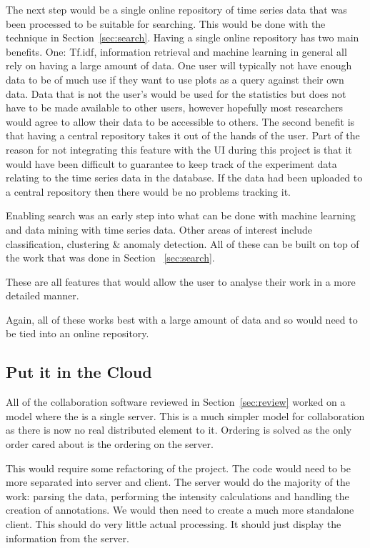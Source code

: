 The next step would be a single online repository of time series data that was been processed to be suitable for searching.  This would be done with the technique in Section~\ref{sec:search}.  Having a single online repository has two main benefits.  One: Tf.idf, information retrieval and machine learning in general all rely on having a large amount of data.  One user will typically not have enough data to be of much use if they want to use plots as a query against their own data.  Data that is not the user's would be used for the statistics but does not have to be made available to other users, however hopefully most researchers would agree to allow their data to be accessible to others.  The second benefit is that having a central repository takes it out of the hands of the user.  Part of the reason for not integrating this feature with the \ac{UI} during this project is that it would have been difficult to guarantee to keep track of the experiment data relating to the time series data in the database.  If the data had been uploaded to a central repository then there would be no problems tracking it.


Enabling search was an early step into what can be done with machine learning and data mining with time series data.  Other areas of interest include classification, clustering \& anomaly detection.  All of these can be built on top of the work that was done in Section ~\ref{sec:search}.

These are all features that would allow the user to analyse their work in a more detailed manner.

Again, all of these works best with a large amount of data and so would need to be tied into an online repository.

\subsection{Put it in the Cloud}
\label{sec:cloud}
All of the collaboration software reviewed in Section~\ref{sec:review} worked on a model where the is a single server.  This is a much simpler model for collaboration as there is now no real distributed element to it.  Ordering is solved as the only order cared about is the ordering on the server.

This would require some refactoring of the project.  The code would need to be more separated into server and client.  The server would do the majority of the work: parsing the data, performing the intensity calculations and handling the creation of annotations.  We would then need to create a much more standalone client.  This should do very little actual processing.  It should just display the information from the server.

